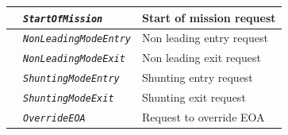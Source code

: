 \begin{itemize}
\begin{longtable}{|l|l|l|}
			\hline

			&	\begin{minipage}[t]{0.30\linewidth} \emph{\texttt{StartOfMission}} \end{minipage}
			&	\begin{minipage}[t]{0.38\linewidth} Start of mission request \end{minipage} \\

			\hline

			&	\begin{minipage}[t]{0.30\linewidth} \emph{\texttt{NonLeadingModeEntry}} \end{minipage}
			&	\begin{minipage}[t]{0.38\linewidth} Non leading entry request \end{minipage} \\

			\hline

			&	\begin{minipage}[t]{0.30\linewidth} \emph{\texttt{NonLeadingModeExit}} \end{minipage}
			&	\begin{minipage}[t]{0.38\linewidth} Non leading exit request \end{minipage} \\

			\hline

			&	\begin{minipage}[t]{0.30\linewidth} \emph{\texttt{ShuntingModeEntry}} \end{minipage}
			&	\begin{minipage}[t]{0.38\linewidth} Shunting entry request \end{minipage} \\

			\hline

			&	\begin{minipage}[t]{0.30\linewidth} \emph{\texttt{ShuntingModeExit}} \end{minipage}
			&	\begin{minipage}[t]{0.38\linewidth}Shunting exit request \end{minipage} \\

			\hline

			&	\begin{minipage}[t]{0.30\linewidth} \emph{\texttt{OverrideEOA}} \end{minipage}
			&	\begin{minipage}[t]{0.38\linewidth} Request to override EOA \end{minipage} \\


\end{longtable}
\end{itemize}
